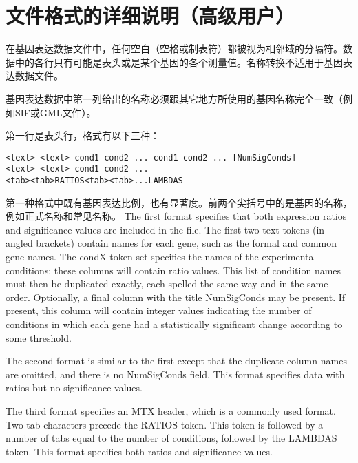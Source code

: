 \section{文件格式的详细说明（高级用户）}
在基因表达数据文件中，任何空白（空格或制表符）都被视为相邻域的分隔符。数据中的各行只有可能是表头或是某个基因的各个测量值。名称转换不适用于基因表达数据文件。

基因表达数据中第一列给出的名称必须跟其它地方所使用的基因名称完全一致（例如SIF或GML文件）。

第一行是表头行，格式有以下三种：
\begin{verbatim}
<text> <text> cond1 cond2 ... cond1 cond2 ... [NumSigConds]
<text> <text> cond1 cond2 ...
<tab><tab>RATIOS<tab><tab>...LAMBDAS
\end{verbatim}
第一种格式中既有基因表达比例，也有显著度。前两个尖括号中的是基因的名称，例如正式名称和常见名称。
The first format specifies that both expression ratios and significance values are included in the file. The first two text tokens (in angled brackets) contain names for each gene, such as the formal and common gene names. The condX token set specifies the names of the experimental conditions; these columns will contain ratio values. This list of condition names must then be duplicated exactly, each spelled the same way and in the same order. Optionally, a final column with the title NumSigConds may be present. If present, this column will contain integer values indicating the number of conditions in which each gene had a statistically significant change according to some threshold. 

The second format is similar to the first except that the duplicate column names are omitted, and there is no NumSigConds field. This format specifies data with ratios but no significance values. 

The third format specifies an MTX header, which is a commonly used format. Two tab characters precede the RATIOS token. This token is followed by a number of tabs equal to the number of conditions, followed by the LAMBDAS token. This format specifies both ratios and significance values. 

